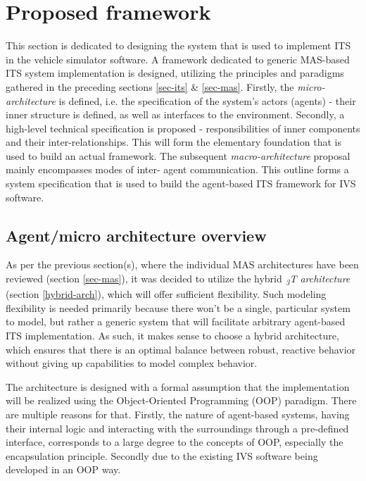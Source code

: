 \documentclass[0main.tex]{subfiles}
\begin{document}
    
\section{Proposed framework}\label{sec-system}

This section is dedicated to designing the system that is used to implement ITS in the
vehicle simulator software. A framework dedicated to generic MAS-based ITS system
implementation is designed, utilizing the principles and paradigms gathered in the
preceding sections \ref{sec-its} \& \ref{sec-mas}. Firstly, the \emph{micro-architecture} is
defined, i.e. the specification of the system's actors (agents) - their inner structure 
is defined, as well as interfaces to the environment. Secondly, a high-level technical specification 
is proposed - responsibilities of inner components and their inter-relationships.
This will form the elementary foundation that is used to build an actual framework.
The subsequent \emph{macro-architecture} proposal mainly encompasses modes of inter-
agent communication. This outline forms a system specification that is used 
to build the agent-based ITS framework for IVS software.

\subsection{Agent/micro architecture overview}

As per the previous section(s), where the individual MAS architectures have been reviewed
(section \ref{sec-mas}), it was decided to utilize the hybrid \emph{\textsubscript{3}T
architecture} (section \ref{hybrid-arch}),
which will offer sufficient flexibility.  Such modeling flexibility is needed primarily because
there won't be a single, particular system to model, but rather a generic system that will
facilitate arbitrary agent-based ITS implementation. As such, it makes sense to choose a hybrid
architecture, which ensures that there is an optimal balance between robust, reactive
behavior without giving up capabilities to model complex behavior.

The architecture is designed with a formal assumption that the implementation will be realized 
using the Object-Oriented Programming (OOP) paradigm. There are multiple reasons for that. Firstly, 
the nature of agent-based systems, having their internal logic and interacting with the surroundings 
through a pre-defined interface, corresponds to a large degree to the concepts of OOP, especially
the encapsulation principle. Secondly due to the existing IVS software being developed in 
an OOP way.
\end{document}

